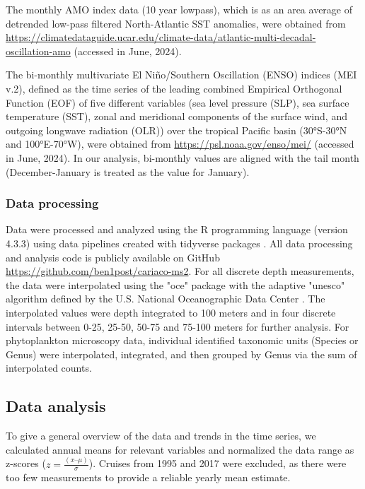 \documentclass[draft]{agujournal2019}
\begin{document}
    The monthly AMO index data (10 year lowpass), which is as an area average of detrended low-pass filtered North-Atlantic SST anomalies, were obtained from \url{https://climatedataguide.ucar.edu/climate-data/atlantic-multi-decadal-oscillation-amo} (accessed in June, 2024).
    
    The bi-monthly multivariate El Niño/Southern Oscillation (ENSO) indices (MEI v.2), defined as the time series of the leading combined Empirical Orthogonal Function (EOF) of five different variables (sea level pressure (SLP), sea surface temperature (SST), zonal and meridional components of the surface wind, and outgoing longwave radiation (OLR)) over the tropical Pacific basin (\ang{30}S-\ang{30}N and \ang{100}E-\ang{70}W), were obtained from \url{https://psl.noaa.gov/enso/mei/} (accessed in June, 2024). In our analysis, bi-monthly values are aligned with the tail month (December-January is treated as the value for January).
    

    \subsubsection{Data processing}
    Data were processed and analyzed using the R programming language (version 4.3.3) \cite{r_core_team_r_2024} using data pipelines created with tidyverse packages \cite{wickham_welcome_2019}. All data processing and analysis code is publicly available on GitHub \url{https://github.com/ben1post/cariaco-ms2}. %
    For all discrete depth measurements, the data were interpolated using the "oce" package \cite{kelley_oce_2023} with the adaptive "unesco" algorithm defined by the U.S. National Oceanographic Data Center \cite{johnson2006world}. The interpolated values were depth integrated to 100 meters and in four discrete intervals between 0-25, 25-50, 50-75 and 75-100 meters for further analysis. For phytoplankton microscopy data, individual identified taxonomic units (Species or Genus) were interpolated, integrated, and then grouped by Genus via the sum of interpolated counts.


\subsection{Data analysis}    
    To give a general overview of the data and trends in the time series, we calculated annual means for relevant variables and normalized the data range as z-scores ($z = \frac{(x – \mu)}{\sigma}$). Cruises from 1995 and 2017 were excluded, as there were too few measurements to provide a reliable yearly mean estimate. 
    
\end{document}
